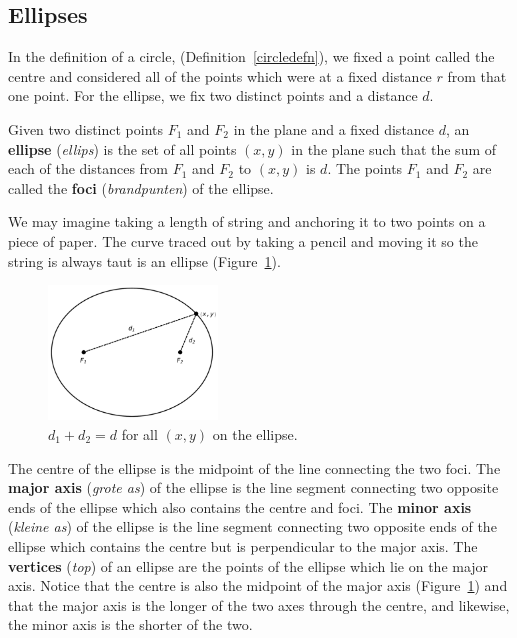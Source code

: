 \ifanalysis\pagebreak\fi
\subsection{Ellipses}
In the definition of a circle, (Definition~\ref{circledefn}), we fixed a point called the centre and considered all of the points which were at a fixed distance $r$ from that one point.  For the ellipse, we fix two distinct points and a distance $d$.  

 \begin{definition}[Ellipse] 
\label{ellipsedefn} 
Given two distinct points $F_1$ and $F_2$ in the plane and a fixed distance $d$, an \textbf{ellipse} (\textit{ellips}) is the set of all points $(x, y)$ in the plane such that the sum of each of the distances from $F_1$ and $F_2$ to $(x, y)$ is $d$.  The points $F_1$ and $F_2$   are called the \textbf{foci} (\textit{brandpunten}) of the ellipse. 
\end{definition} 
We may imagine taking a length of string and anchoring it to two points on a piece of paper.  The curve traced out by taking a pencil and moving it so the string is always taut is an ellipse (Figure~\ref{fig_algebraic_21}). 

\begin{figure}[h]
	\begin{center}
			\includegraphics[width=0.4\textwidth]{fig_algebraic_21}
	\caption{$d_1 + d_2 = d$ for all $(x, y)$ on the ellipse.}
	\label{fig_algebraic_21}
	\end{center}
\end{figure}


The   centre of the ellipse is the midpoint of the line connecting the two foci.  The \textbf{major axis} (\textit{grote as}) of the ellipse is the line segment connecting two opposite ends of the ellipse which also contains the centre and foci.  The \textbf{minor axis} (\textit{kleine as}) of the ellipse is the line segment connecting two opposite ends of the ellipse which contains the centre but is perpendicular to the major axis.  The    \textbf{vertices} (\textit{top}) of an ellipse are the points of the ellipse which lie on the major axis.  Notice that the centre is also the midpoint of the major axis (Figure~\ref{fig_algebraic_21}) and that the major axis is the longer of the two axes through the centre, and likewise, the minor axis is the shorter of the two. 

